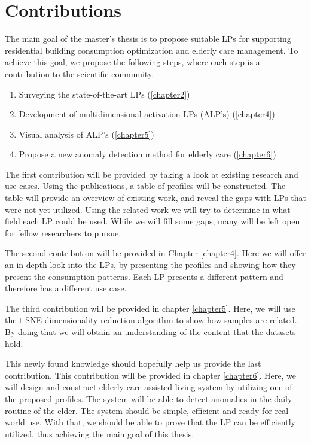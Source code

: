 \section{Contributions}
\label{sec:contributions} %

The main goal of the master's thesis is to propose suitable LPs for supporting residential building consumption optimization and elderly care management.
To achieve this goal, we propose the following steps, where each step is a contribution to the scientific community.

\begin{enumerate}
	\item Surveying the state-of-the-art LPs (\ref{chapter2})
	\item Development of multidimensional activation LPs (ALP's) (\ref{chapter4})
	\item Visual analysis of ALP's (\ref{chapter5})
	\item Propose a new anomaly detection method for elderly care (\ref{chapter6})
\end{enumerate}


The first contribution will be provided by taking a look at existing research and use-cases. 
Using the publications, a table of profiles will be constructed.
The table will provide an overview of existing work, and reveal the gaps with LPs that were not yet utilized.
Using the related work we will try to determine in what field each LP could be used. 
While we will fill some gaps, many will be left open for fellow researchers to pursue.  

The second contribution will be provided in Chapter \ref{chapter4}.
Here we will offer an in-depth look into the LPs, by presenting the profiles and showing how they present the consumption patterns.
Each LP presents a different pattern and therefore has a different use case. 

The third contribution will be provided in chapter \ref{chapter5}.
Here, we will use the t-SNE dimensionality reduction algorithm to show how samples are related.
By doing that we will obtain an understanding of the content that the datasets hold.

This newly found knowledge should hopefully help us provide the last contribution.
This contribution will be provided in chapter \ref{chapter6}.
Here, we will design and construct elderly care assisted living system by utilizing one of the proposed profiles.
The system will be able to detect anomalies in the daily routine of the elder.
The system should be simple, efficient and ready for real-world use.
With that, we should be able to prove that the LP can be efficiently utilized,
thus achieving the main goal of this thesis.


